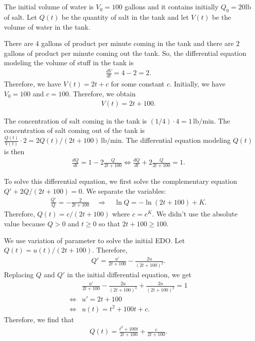 \documentclass[12pt]{article}
\newcommand{\Ra}{\Rightarrow}
\newcommand{\exo}[3]{\noindent\textcolor{red}{\fbox{\textbf{Section {#1} | Problem {#2} | {#3} points}}}\\}
\begin{document}
	\newpage
	
	\exo{4.2}{11}{25}
	\\
	The initial volume of water is $V_0 = 100$ gallons and it contains initially $Q_0 = 20\text{lb}$ of salt. Let $Q(t)$ be the quantity of salt in the tank and let $V(t)$ be the volume of water in the tank. 
	
	There are $4$ gallons of product per minute coming in the tank and there are $2$ gallons of product per minute coming out the tank. So, the differential equation modeling the volume of stuff in the tank is
		\begin{align*}
		\frac{dV}{dt} = 4 - 2 = 2 .
		\end{align*}
	Therefore, we have $V(t) = 2t + c$ for some constant $c$. Initially, we have $V_0 = 100$ and $c = 100$. Therefore, we obtain 
		\begin{align*}
		V (t) = 2t + 100 .
		\end{align*}
	
	The concentration of salt coming in the tank is $(1/4) \cdot 4 = 1 \, \mathrm{lb}/\mathrm{min}$. The concentration of salt coming out of the tank is $\frac{Q(t)}{V(t)} \cdot 2 = 2 Q(t)/(2t + 100) \,  \mathrm{lb}/\mathrm{min}$. The differential equation modeling $Q(t)$ is then
		\begin{align*}
		\frac{dQ}{dt} = 1 - 2\frac{Q}{2t + 100} \iff \frac{dQ}{dt} + 2 \frac{Q}{2t + 100} = 1 .
		\end{align*}
	
	To solve this differential equation, we first solve the complementary equation $Q' + 2 Q/(2t+ 100) = 0$. We separate the variables:
		\begin{align*}
		\frac{Q'}{Q} = -\frac{2}{2t + 100} \quad \Ra \quad \ln Q = -\ln (2t + 100) + K .
		\end{align*}
	Therefore, $Q (t) = c/(2t + 100)$ where $c = e^K$. We didn't use the absolute value because $Q > 0$ and $t \geq 0$ so that $2t + 100 \geq 100$. 
	
	We use variation of parameter to solve the initial EDO. Let $Q(t) = u(t) / (2t + 100)$. Therefore, 
		\begin{align*}
		Q' = \frac{u'}{2t + 100} - \frac{2u}{(2t + 100)^2} .
		\end{align*}	
	Replacing $Q$ and $Q'$ in the initial differential equation, we get
		\begin{align*}
		& \frac{u'}{2t + 100} - \frac{2u}{(2t + 100)^2} + \frac{2u}{(2t + 100)^2} = 1 \\
		\iff & u' = 2t + 100 \\
		\iff & u (t) = t^2 + 100 t + c .
		\end{align*}		
	Therefore, we find that
		\begin{align*}
		Q(t) = \frac{t^2 + 100 t}{2t + 100} + \frac{c}{2t + 100} .
		\end{align*}	
	
\end{document}
